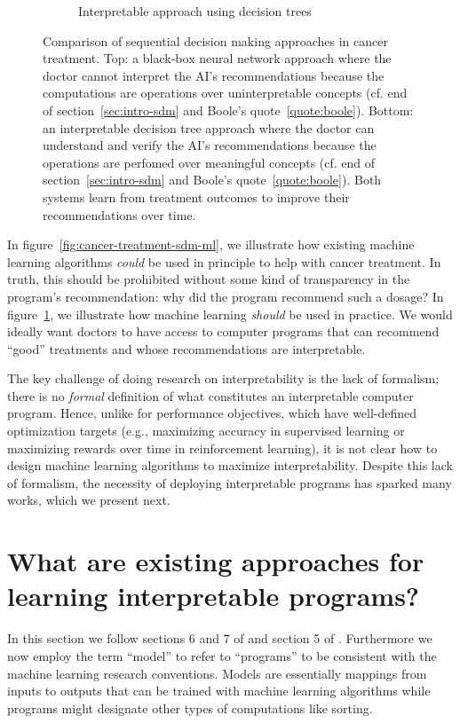 \begin{figure}
\begin{subfigure}[b]{0.7\textwidth}
\begin{tikzpicture}
        \end{tikzpicture}
        \caption{Interpretable approach using decision trees}
        \label{fig:cancer-treatment-comparison}
    \end{subfigure}
    \caption{Comparison of sequential decision making approaches in cancer treatment. Top: a black-box neural network approach where the doctor cannot interpret the AI's recommendations because the computations are operations over uninterpretable concepts (cf. end of section~\ref{sec:intro-sdm} and Boole's quote~\ref{quote:boole}). Bottom: an interpretable decision tree approach where the doctor can understand and verify the AI's recommendations because the operations are perfomed over meaningful concepts  (cf. end of section~\ref{sec:intro-sdm} and Boole's quote~\ref{quote:boole}). Both systems learn from treatment outcomes to improve their recommendations over time.}
    \label{fig:cancer-treatment-comparison-combined}
\end{figure}

In figure~\ref{fig:cancer-treatment-sdm-ml}, we illustrate how existing machine learning algorithms \textit{could} be used in principle to help with cancer treatment. In truth, this should be prohibited without some kind of transparency in the program's recommendation: why did the program recommend such a dosage?
In figure~\ref{fig:cancer-treatment-comparison}, we illustrate how machine learning \textit{should} be used in practice. We would ideally want doctors to have access to computer programs that can recommend ``good'' treatments and whose recommendations are interpretable. 

The key challenge of doing research on interpretability is the lack of formalism; there is no \textit{formal} definition of what constitutes an interpretable computer program. Hence, unlike for performance objectives, which have well-defined optimization targets (e.g., maximizing accuracy in supervised learning or maximizing rewards over time in reinforcement learning), it is not clear how to design machine learning algorithms to maximize interpretability. 
Despite this lack of formalism, the necessity of deploying interpretable programs has sparked many works, which we present next.
\section{What are existing approaches for learning interpretable programs?}\label{sec:intro-interp}

In this section we follow sections 6 and 7 of \cite{glanois-survey} and section 5 of \cite{milani-survey}. 
Furthermore we now employ the term ``model'' to refer to ``programs'' to be consistent with the machine learning research conventions.
Models are essentially mappings from inputs to outputs that can be trained with machine learning algorithms while programs might designate other types of computations like sorting.

